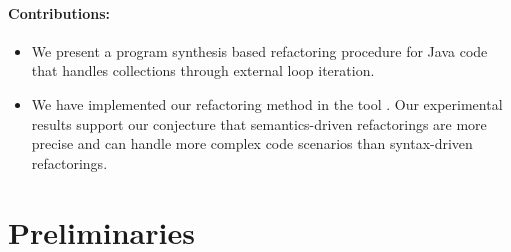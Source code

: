 \documentclass[runningheads,a4paper]{llncs}
\begin{document}
\paragraph{Contributions:}
%
\begin{itemize}
%
\item We present a program synthesis based refactoring procedure for Java
code that handles collections through external loop iteration.
%
%
\item We have implemented our refactoring method in the tool \tool. Our
experimental results support our conjecture that semantics-driven
refactorings are more precise and can handle more complex code scenarios
than syntax-driven refactorings.
%
\end{itemize}



\section{Preliminaries} \label{sec:preliminaries}


%
\end{document}
